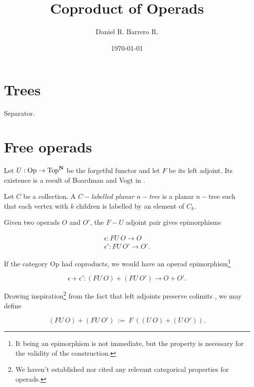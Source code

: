 \documentclass{amsart}
\title{Coproduct of Operads}
\author{Daniel R. Barrero R.}
\date{\today}
\begin{document}

\maketitle

\section{Trees}



\newpage\thispagestyle{plain}

Separator.

\newpage

\section{Free operads}

Let $U : \mathrm{Op} \to \mathrm{Top}^{\mathbf{N}}$ be the forgetful functor and
let $F$ be its left adjoint. Its existence is a result of Boardman and Vogt
in \cite{bv-hiasots}.

\begin{defn}
	Let $C$ be a collection. A \emph{$C-$labelled planar $n-$tree} is a
	planar $n-$tree such that each vertex with $k$ children is labelled
	by an element of $C_k$.
\end{defn}

Given two operads $O$ and $O'$, the $F-U$ adjoint pair gives epimorphisms 

\begin{eqnarray}\label{fu-epis}
	\epsilon : FU \ O \to O \\
	\epsilon' : FU \ O' \to O'.
\end{eqnarray}

If the category $\mathrm{Op}$ had coproducts, we would have an operad
epimorphism\footnote{It being an epimorphism is not immediate, but the
property is necessary for the validity of the construction.}

\begin{equation}\label{cpd-epis}
	\epsilon + \epsilon' : (FU \ O) + (FU \ O') \to O + O'.
\end{equation}

Drawing inspiration\footnote{We haven't established nor cited any relevant
categorical properties for operads.} from the fact that left adjoints
preserve colimits \cite{riehl-ctic}, we may define


\begin{equation}\label{fu-coprod}
	(FU \ O) + (FU \ O') \ := \ F \ \left( (U \ O) + (U \ O')
	\right).
\end{equation}
\end{document}
